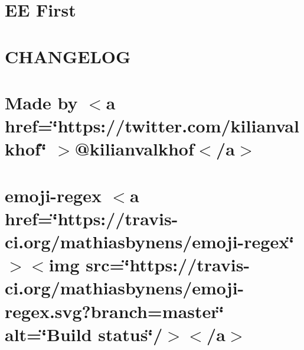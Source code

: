 \documentclass[twoside]{book}
\newcommand{\+}{\discretionary{\mbox{\scriptsize$\hookleftarrow$}}{}{}}
\begin{document}
\chapter{EE First}
\label{md__c___users_vaishnavi_jadhav__desktop__developer_code_mean_stack_example_client_node_modules_ee_first__r_e_a_d_m_e}

\chapter{CHANGELOG}
\label{md__c___users_vaishnavi_jadhav__desktop__developer_code_mean_stack_example_client_node_modules_ed3182c62ea16302a532839ef9addc1f2}

\chapter{Made by \texorpdfstring{$<$}{<}a href=\char`\"{}https\+://twitter.\+com/kilianvalkhof\char`\"{} \texorpdfstring{$>$}{>}@kilianvalkhof\texorpdfstring{$<$}{<}/a\texorpdfstring{$>$}{>}}
\label{md__c___users_vaishnavi_jadhav__desktop__developer_code_mean_stack_example_client_node_modules_e9e6c9ecb8bad755679f9baf11fc7661c}

\chapter{emoji-\/regex \texorpdfstring{$<$}{<}a href=\char`\"{}https\+://travis-\/ci.\+org/mathiasbynens/emoji-\/regex\char`\"{} \texorpdfstring{$>$}{>}\texorpdfstring{$<$}{<}img src=\char`\"{}https\+://travis-\/ci.\+org/mathiasbynens/emoji-\/regex.\+svg?branch=master\char`\"{} alt=\char`\"{}\+Build status\char`\"{}/\texorpdfstring{$>$}{>}\texorpdfstring{$<$}{<}/a\texorpdfstring{$>$}{>}}
\label{md__c___users_vaishnavi_jadhav__desktop__developer_code_mean_stack_example_client_node_modules_emoji_regex__r_e_a_d_m_e}

\end{document}
